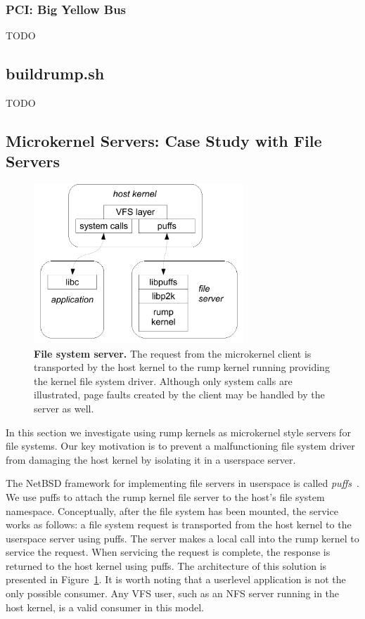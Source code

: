 \subsubsection{PCI: Big Yellow Bus}

TODO

\subsection{buildrump.sh}
\label{sect:buildrump.sh}

TODO


\clearpage
\subsection{Microkernel Servers: Case Study with File Servers}
\label{sect:libp2k}

\begin{figure}[t]
\includegraphics[height=6cm]{puffsarch}
\caption[File system server]{
\textbf{File system server.}
The request from the microkernel client is transported by the host kernel
to the rump kernel running providing the kernel file system driver.
Although only system calls are illustrated, page faults created by
the client may be handled by the server as well.
}
\label{fig:fsserv}
\end{figure}

In this section we investigate using rump kernels as microkernel
style servers for file systems.  Our key motivation is to
prevent a malfunctioning file system driver from damaging the host
kernel by isolating it in a userspace server.

The NetBSD framework for implementing file servers in userspace is
called \textit{puffs}~\cite{kantee:puffs}.  We use puffs to attach
the rump kernel file server to the host's file system namespace.  Conceptually,
after the file system has been mounted, the service works as
follows: a file system request is transported from the host kernel
to the userspace server using puffs.  The server makes a local call
into the rump kernel to
service the request.  When servicing the request is complete, the response is returned
to the host kernel using puffs.  The architecture of this solution
is presented in Figure~\ref{fig:fsserv}.  It is worth noting that
a userlevel application is not the only possible
consumer.  Any VFS user, such as an NFS server running in the host kernel,
is a valid consumer in this model.


